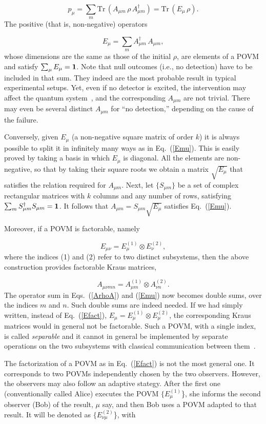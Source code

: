 \documentclass[12pt]{article}
\def\beq{\begin{equation}}
\def\eeq{\end{equation}}
\def\Eq{Eq.~(\ref}
\def\0{\otimes}
\def\Tr{\mbox{Tr}\,}
\begin{document}
\beq  p_\mu=\sum_m\Tr(A_{\mu m}\,\rho\,A_{\mu m}^\dagger)=
  \Tr(E_\mu\,\rho).\eeq
The positive (that is, non-negative) operators 

\beq E_\mu=\sum_m A_{\mu m}^\dagger\,A_{\mu m}, \label{Emu}\eeq
whose dimensions are the same as those of the initial $\rho$, are
elements of a POVM and satisfy $\sum_\mu E_\mu={\bf1}$. Note that null
outcomes (i.e., no detection) have to be included in that sum. They
indeed are the most probable result in typical experimental setups. Yet,
even if no detector is excited, the intervention may affect the quantum
system~\cite{Dicke}, and the corresponding $A_{\mu m}$ are not trivial.
There may even be several distinct $A_{\mu m}$ for ``no detection,''
depending on the cause of the failure.

Conversely, given $E_\mu$ (a non-negative square matrix of order $k$) it
is always possible to split it in infinitely many ways as in
\Eq{Emu}). This is easily proved by taking a basis in which $E_\mu$ is
diagonal. All the elements are non-negative, so that by taking their
square roots we obtain a matrix $\sqrt{E_\mu}$ that satisfies the
relation required for $A_{\mu m}$. Next, let $\{S_{\mu m}\}$ be a set
of complex rectangular matrices with $k$ columns and any number of rows,
satisfying $\sum_m S_{\mu m}^\dagger S_{\mu m}={\bf1}$. It follows that
$A_{\mu m}=S_{\mu m}\sqrt{E_\mu}$ satisfies \Eq{Emu}).

Moreover, if a POVM is factorable, namely

\beq E_{\mu\nu}=E_\mu^{(1)}\0E_\nu^{(2)}, \label{Efact} \eeq
where the indices (1) and (2) refer to two distinct subsystems, then
the above construction provides factorable Kraus matrices, 

\beq A_{\mu\nu mn}=A_{\mu m}^{(1)}\0A_{\nu n}^{(2)}. \eeq
The operator sum in Eqs.~(\ref{ArhoA}) and (\ref{Emu}) now becomes
double sums, over the indices $m$ and $n$. Such double sums are indeed
needed. If we had simply written, instead of \Eq{Efact}),
$E_{\mu}=E_\mu^{(1)}\0E_\mu^{(2)}$, the corresponding Kraus matrices
would in general not be factorable. Such a POVM, with a single index, is
called {\it separable\/} and it cannot in general be implemented by
separate operations on the two subsystems with classical communication
between them~\cite{Ben}.

The factorization of a POVM as in \Eq{Efact}) is not the most general
one. It corresponds to two POVMs independently chosen by the two
observers. However, the observers may also follow an adaptive stategy.
After the first one (conventionally called Alice) executes the POVM
$\{E_\mu^{(1)}$\}, she informs the second observer (Bob) of the result,
$\mu$ say, and then Bob uses a POVM adapted to that result. It will be
denoted as $\{E_{\nu\mu}^{(2)}$\}, with
\end{document}
